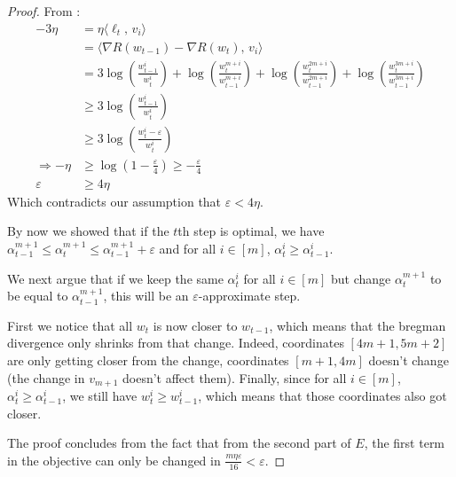 \documentclass[10pt]{article}
\theoremstyle{definition}
\theoremstyle{remark}
\renewcommand{\epsilon}{\varepsilon}
\newcommand\inprod[2]{\langle #1,\,#2 \rangle}
\newcommand{\roundy}[1]{ {\left( #1 \right)}}
\begin{document}
\begin{proof}
From :
\begin{align*}
    -3\eta &= \eta\inprod{\ell_t}{v_{i}}\\
    &= \inprod{\nabla R(w_{t-1})-\nabla R(w_t)}{v_{i}}\\
    &= 3\log\roundy{\frac{w_{t-1}^i}{w_t^i}} + \log\roundy{\frac{w_t^{m+i}}{w_{t-1}^{m+i}}} + \log\roundy{\frac{w_t^{2m+i}}{w_{t-1}^{2m+i}}} + \log\roundy{\frac{w_t^{3m+i}}{w_{t-1}^{3m+i}}}\\
    &\ge 3\log\roundy{\frac{w_{t-1}^i}{w_t^i}}\\
    &\ge 3\log\roundy{\frac{w_t^i-\epsilon}{w_t^i}}\\
    \Longrightarrow -\eta &\ge \log\roundy{1 - \frac{\epsilon}{4}} \ge -\frac{\epsilon}{4} \\
    \epsilon &\ge 4\eta
\end{align*}
Which contradicts our assumption that $\epsilon < 4\eta$.

By now we showed that if the $t$th step is optimal, we have $\alpha_{t-1}^{m+1} \le \alpha_{t}^{m+1} \le \alpha_{t-1}^{m+1} + \epsilon$ and for all $i\in[m]$, $\alpha_t^i \ge \alpha_{t-1}^i$.

We next argue that if we keep the same $\alpha_{t}^i$ for all $i\in[m]$ but change $\alpha_{t}^{m+1}$ to be equal to $\alpha_{t-1}^{m+1}$, this will be an $\epsilon$-approximate step.

First we notice that all $w_t$ is now closer to $w_{t-1}$, which means that the bregman divergence only shrinks from that change. Indeed, coordinates $[4m+1,5m+2]$ are only getting closer from the change, coordinates $[m+1,4m]$ doesn't change (the change in $v_{m+1}$ doesn't affect them). Finally, since for all $i\in[m]$, $\alpha_t^i \ge \alpha_{t-1}^i$, we still have $w_t^i \ge w_{t-1}^i$, which means that those coordinates also got closer.

The proof concludes from the fact that from the second part of $E$, the first term in the objective can only be changed in $\frac{m\eta\epsilon}{16} < \epsilon$.

\end{proof}
\end{document}

